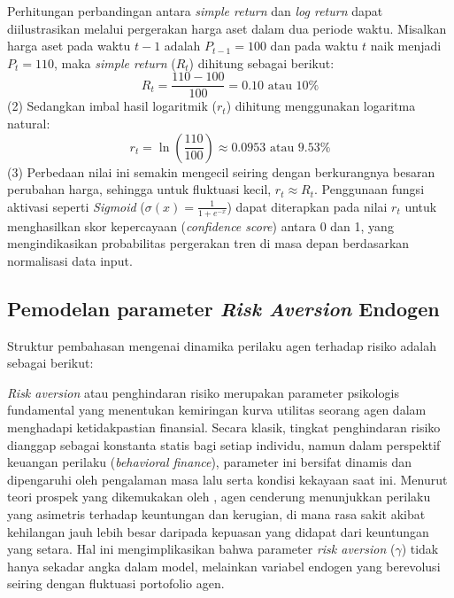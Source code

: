\begin{example}
    Perhitungan perbandingan antara \textit{simple return} dan \textit{log return} dapat diilustrasikan melalui pergerakan harga aset dalam dua periode waktu. Misalkan harga aset pada waktu $t-1$ adalah $P_{t-1} = 100$ dan pada waktu $t$ naik menjadi $P_t = 110$, maka \textit{simple return} ($R_t$) dihitung sebagai berikut:
    $$ R_t = \frac{110 - 100}{100} = 0.10 \text{ atau } 10\% $$ (2)
    Sedangkan imbal hasil logaritmik ($r_t$) dihitung menggunakan logaritma natural:
    $$ r_t = \ln \left( \frac{110}{100} \right) \approx 0.0953 \text{ atau } 9.53\% $$ (3)
    Perbedaan nilai ini semakin mengecil seiring dengan berkurangnya besaran perubahan harga, sehingga untuk fluktuasi kecil, $r_t \approx R_t$. Penggunaan fungsi aktivasi seperti \textit{Sigmoid} ($\sigma(x) = \frac{1}{1 + e^{-x}}$) dapat diterapkan pada nilai $r_t$ untuk menghasilkan skor kepercayaan (\textit{confidence score}) antara 0 dan 1, yang mengindikasikan probabilitas pergerakan tren di masa depan berdasarkan normalisasi data input.
\end{example}

\subsection{Pemodelan parameter \textit{Risk Aversion} Endogen}
Struktur pembahasan mengenai dinamika perilaku agen terhadap risiko adalah sebagai berikut:

\textit{Risk aversion} atau penghindaran risiko merupakan parameter psikologis fundamental yang menentukan kemiringan kurva utilitas seorang agen dalam menghadapi ketidakpastian finansial. Secara klasik, tingkat penghindaran risiko dianggap sebagai konstanta statis bagi setiap individu, namun dalam perspektif keuangan perilaku (\textit{behavioral finance}), parameter ini bersifat dinamis dan dipengaruhi oleh pengalaman masa lalu serta kondisi kekayaan saat ini. Menurut teori prospek yang dikemukakan oleh \cite{kahneman_prospect_1979}, agen cenderung menunjukkan perilaku yang asimetris terhadap keuntungan dan kerugian, di mana rasa sakit akibat kehilangan jauh lebih besar daripada kepuasan yang didapat dari keuntungan yang setara. Hal ini mengimplikasikan bahwa parameter \textit{risk aversion} ($\gamma$) tidak hanya sekadar angka dalam model, melainkan variabel endogen yang berevolusi seiring dengan fluktuasi portofolio agen.

